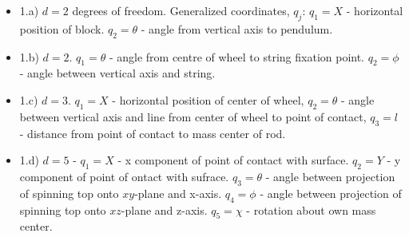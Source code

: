 \documentclass[11pt,a4paper]{report}
\newcounter{excount}[chapter]
\newenvironment{exercise}[1][]{\addtocounter{excount}{1} \noindent {\bf Problem
    \arabic{excount} \ \ #1}\hspace{2mm}}{\vspace{4mm}}
\begin{document}
\begin{exercise}
\begin{itemize}
\item 1.a)
$d=2$ degrees of freedom.  Generalized coordinates,  $q_j$: $q_1=X$ - horizontal position of block. $q_2=\theta$ - angle from vertical axis to pendulum. 
\item 1.b) $d=2$. $q_1=\theta$ - angle from centre of wheel to string fixation point. $q_2=\phi$ - angle between vertical axis and string.
\item 1.c)
$d=3$. $q_1=X$ - horizontal position of center of wheel, $q_2=\theta$ - angle between vertical axis and line from center of wheel to point of contact, $q_3=l$ - distance from point of contact to mass center of rod.
\item 1.d)
$d=5$ - $q_1=X$ - x component of point of contact with surface. $q_2=Y$ - y component of point of ontact with sufrace. $q_3=\theta$ - angle between projection of spinning top onto $xy$-plane and x-axis. $q_4=\phi$ - angle between projection of spinning top onto $xz$-plane and z-axis. $q_5=\chi$ - rotation about own mass center.
\end{itemize}

\end{exercise}



\end{document}
